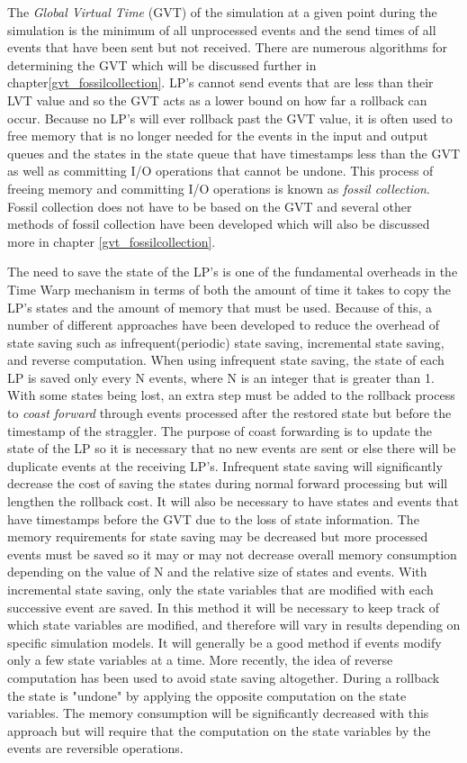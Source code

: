 \documentclass[11pt]{book}
\begin{document}
The \emph{Global Virtual Time} (GVT) of the simulation at a given point during the simulation is the minimum
of all unprocessed events and the send times of all events that have been sent but not received\cite{jefferson-85}.
There are numerous algorithms for determining the GVT which will be discussed further in
chapter\ref{gvt_fossilcollection}. LP's cannot send events that are less than their LVT value and so
the GVT acts as a lower bound on how far a rollback can occur. Because no LP's will ever rollback
past the GVT value, it is often used to free memory that is no longer needed for the events in the
input and output queues and the states in the state queue that have timestamps less than the GVT
as well as committing I/O operations that cannot be undone. This process of freeing memory and
committing I/O operations is known as \emph{fossil collection}. Fossil collection does not have to
be based on the GVT and several other methods of fossil collection have been developed which will
also be discussed more in chapter \ref{gvt_fossilcollection}.

The need to save the state of the LP's is one of the fundamental overheads in the Time Warp mechanism
in terms of both the amount of time it takes to copy the LP's states and the amount of memory that must
be used. Because of this, a number of different approaches have been developed to reduce the overhead
of state saving such as infrequent(periodic) state saving, incremental state saving, and reverse
computation. When using infrequent state saving, the state of each LP is saved only every N events,
where N is an integer that is greater than 1. With some states being lost, an extra step must be added
to the rollback process to \emph{coast forward} through events processed after the restored state but
before the timestamp of the straggler. The purpose of coast forwarding is to update the state of the
LP so it is necessary that no new events are sent or else there will be duplicate events at the
receiving LP's. Infrequent state saving will significantly decrease the cost of saving the states
during normal forward processing but will lengthen the rollback cost. It will also be necessary to
have states and events that have timestamps before the GVT due to the loss of state information.
The memory requirements for state saving may be decreased but more processed events must be saved
so it may or may not decrease overall memory consumption depending on the value of N and the
relative size of states and events. With incremental state saving, only the state variables that
are modified with each successive event are saved. In this method it will be necessary to keep
track of which state variables are modified, and therefore will vary in results depending on specific
simulation models. It will generally be a good method if events modify only a few state variables at a time.
More recently, the idea of reverse computation has been used to avoid state saving altogether. During
a rollback the state is "undone" by applying the opposite computation on the state
variables. The memory consumption will be significantly decreased with this approach but will require
that the computation on the state variables by the events are reversible operations.
\end{document}

